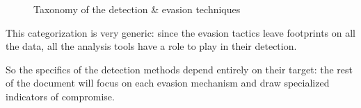 \hspace*{-1.5cm}
\begin{figure}[p]
\centering

\caption{Taxonomy of the detection \& evasion techniques}
\label{fig:taxonomy}
\end{figure}

This categorization is very generic: since the evasion tactics leave footprints on all the data, all the analysis tools have a role to play in their detection.

So the specifics of the detection methods depend entirely on their target: the rest of the document will focus on each evasion mechanism and draw specialized indicators of compromise.

